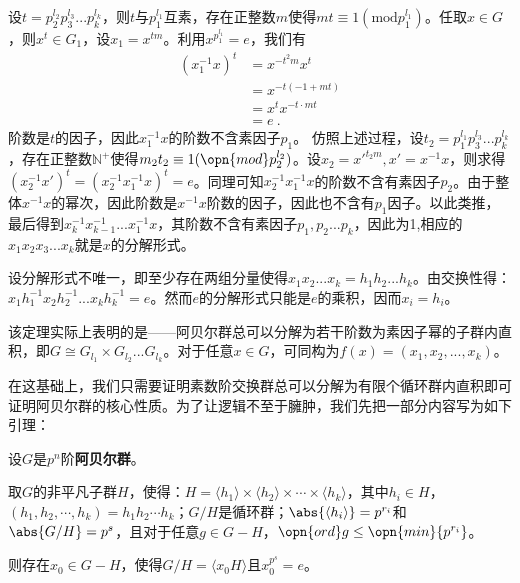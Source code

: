 设$t=p_2^{l_2}p_3^{l_3}...p_k^{l_k}$，则$t$与$p_1^{l_1}$互素，存在正整数$m$使得$mt\equiv 1(\mathrm {mod} p_1^{l_1})$。任取$x\in G$，则$x^t\in G_1$，设$x_1=x^{tm}$。利用$x^{p_1^{l_1}}=e$，我们有
\begin{equation}
\begin{aligned}
(x_1^{-1}x)^t&=x^{-t^2m}x^t\\
&=x^{-t(-1+mt)}\\
&=x^tx^{-t\cdot mt}\\
&=e~.
\end{aligned}
\end{equation}
阶数是$t$的因子，因此$x_1^{-1}x$的阶数不含素因子$p_1$。
仿照上述过程，设$t_2=p_1^{l_1}p_3^{l_3}...p_k^{l_k}$，存在正整数$\mathbb N^{+}$使得$m_2t_2\equiv 1(\opn{mod}p_2^{l_2})$。设$x_2=x'^{t_2m},x'=x^{-1}x$，则求得$(x_2^{-1}x')^t=(x_2^{-1}x_1^{-1}x)^t=e$。同理可知$x_2^{-1}x_1^{-1}x$的阶数不含有素因子$p_2$。由于整体$x^{-1}x$的幂次，因此阶数是$x^{-1}x$阶数的因子，因此也不含有$p_1$因子。以此类推，最后得到$x_k^{-1}x_{k-1}^{-1}...x_1^{-1}x$，其阶数不含有素因子$p_1,p_2...p_k$，因此为1,相应的$x_1x_2x_3...x_k$就是$x$的分解形式。

设分解形式不唯一，即至少存在两组分量使得$x_1x_2...x_k=h_1h_2...h_k$。由交换性得：$x_1h_1^{-1}x_2h_2^{-1}...x_kh_k^{-1}=e$。然而$e$的分解形式只能是$e$的乘积，因而$x_i=h_i$。

该定理实际上表明的是——阿贝尔群总可以分解为若干阶数为素因子幂的子群内直积，即$G\cong G_{l_1}\times G_{l_2}...G_{l_k}$。对于任意$x\in G$，可同构为$f(x)=(x_1,x_2,...,x_k)$。

在这基础上，我们只需要证明素数阶交换群总可以分解为有限个循环群内直积即可证明阿贝尔群的核心性质。为了让逻辑不至于臃肿，我们先把一部分内容写为如下引理：



\begin{lemma}{}\label{lem_Albert_1}
设$G$是$p^n$阶\textbf{阿贝尔群}。

取$G$的非平凡子群$H$，使得：$H=\langle h_1 \rangle\times\langle h_2 \rangle\times\cdots\times\langle h_k \rangle$，其中$h_i\in H$，$(h_1, h_2, \cdots, h_k)=h_1h_2\cdots h_k$；$G/H$是循环群；$\abs{\langle h_i \rangle}=p^{r_i}$和$\abs{G/H}=p^s$，且对于任意$g\in G-H$，$\opn{ord}g\leq \opn{min}\{p^{r_i}\}$。

则存在$x_0\in G-H$，使得$G/H=\langle x_0H \rangle$且$x_0^{p^s}=e$。
\end{lemma}

